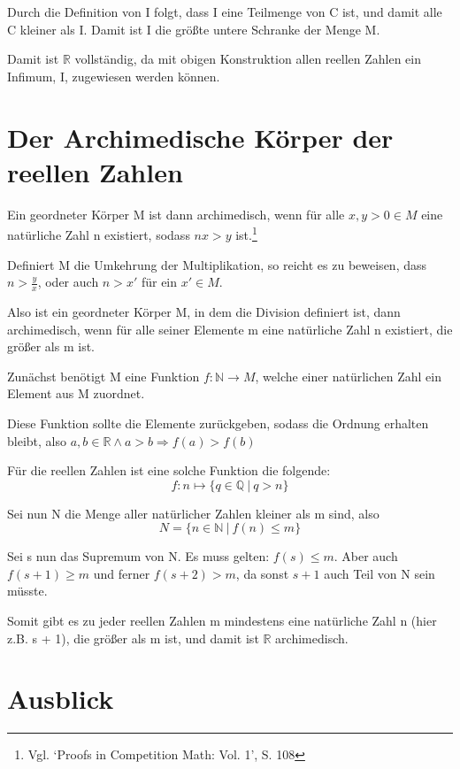 \documentclass[12pt]{article}
\begin{document}
    Durch die Definition von I folgt, dass I eine Teilmenge von C ist, und damit alle C kleiner als I.
    Damit ist I die größte untere Schranke der Menge M.

    Damit ist $\mathbb{R}$ vollständig, da mit obigen Konstruktion allen reellen Zahlen ein Infimum, I, zugewiesen werden
    können.

    \section{Der Archimedische Körper der reellen Zahlen}

    Ein geordneter Körper M ist dann archimedisch, wenn für alle $x, y > 0 \in M$ eine natürliche Zahl n
    existiert, sodass $nx > y$ ist.\footnote{
        Vgl. `Proofs in Competition Math: Vol. 1', S. 108
    }

    Definiert M die Umkehrung der Multiplikation, so reicht es zu beweisen, dass $n > \frac{y}{x}$, oder
    auch $n > x'$ für ein $x' \in M$.

    Also ist ein geordneter Körper M, in dem die Division definiert ist, dann archimedisch,
    wenn für alle seiner Elemente m eine natürliche Zahl n existiert, die größer als m ist.

    Zunächst benötigt M eine Funktion $f: \mathbb{N} \rightarrow M$,
    welche einer natürlichen Zahl ein Element aus M zuordnet.

    Diese Funktion sollte die Elemente zurückgeben, sodass die Ordnung erhalten bleibt, also
    $a, b \in \mathbb{R} \land a > b \Rightarrow f(a) > f(b)$

    Für die reellen Zahlen ist eine solche Funktion die folgende:
    \[f: n \mapsto \{q \in \mathbb{Q} \mspace{4mu} | \mspace{4mu} q > n\}\]

    Sei nun N die Menge aller natürlicher Zahlen kleiner als m sind, also
    \[N = \{n \in \mathbb{N} \mspace{4mu} | \mspace{4mu} f(n) \le m\}\]

    Sei s nun das Supremum von N.
    Es muss gelten: $f(s) \le m$.
    Aber auch $f(s+1) \ge m$ und ferner $f(s+2) > m$, da sonst $s+1$ auch Teil von N sein müsste.

    Somit gibt es zu jeder reellen Zahlen m mindestens eine natürliche Zahl n (hier z.B. s + 1), die größer als m ist,
    und  damit ist $\mathbb{R}$ archimedisch.

    \newpage

    \section{Ausblick}
\end{document}
